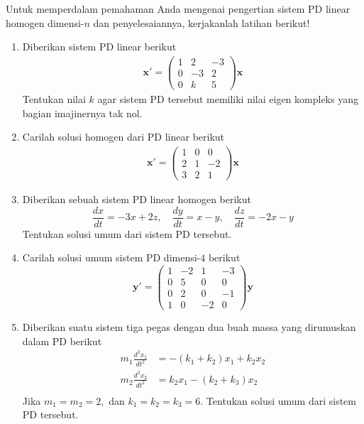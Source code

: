 \documentclass[a4paper]{article}
\theoremstyle{definisi}
\numberwithin{equation}{section}
\begin{document}
  \newpage
  \noindent Untuk memperdalam pemahaman Anda mengenai pengertian sistem PD linear homogen dimensi-$n$ dan penyelesaiannya, kerjakanlah latihan berikut!
  \begin{enumerate}
    \item Diberikan sistem PD linear berikut
    \begin{align*}
      \mathbf{x'} = \begin{pmatrix}
        1 & 2 & -3\\
        0 & -3 & 2\\
        0 & k & 5
      \end{pmatrix}\mathbf{x}
    \end{align*}
    Tentukan nilai $k$ agar sistem PD tersebut memiliki nilai eigen kompleks yang bagian imajinernya tak nol.
    \item Carilah solusi homogen dari PD linear berikut
    \begin{align*}
      \mathbf{x'} = \begin{pmatrix}
        1 & 0 & 0\\
        2 & 1 & -2\\
        3 & 2 & 1
      \end{pmatrix}\mathbf{x}
    \end{align*}

    \item Diberikan sebuah sistem PD linear homogen berikut
    \begin{equation*}
        \frac{dx}{dt}=-3x+2z,\quad
        \frac{dy}{dt}=x-y,\quad
        \frac{dz}{dt}=-2x-y
    \end{equation*}
    Tentukan solusi umum dari sistem PD tersebut.
    
    \item Carilah solusi umum sistem PD dimensi-$4$ berikut
    \[\mathbf{y'}=\begin{pmatrix}
      1 & -2 & 1 & -3\\
      0 & 5 & 0 & 0\\
      0 & 2 & 0 & -1\\
      1 & 0 & -2 & 0
    \end{pmatrix}\mathbf{y}\]
    
    \item Diberikan suatu sistem tiga pegas dengan dua buah massa yang dirumuskan dalam PD berikut
    \begin{equation*}
      \begin{split}
        m_1\frac{d^2x_1}{dt^2}&=-(k_1+k_2)x_1+k_2x_2\\
        m_2\frac{d^2x_2}{dt^2}&=k_2x_1-(k_2+k_3)x_2\\
      \end{split}
    \end{equation*}
    Jika $m_1=m_2=2,$ dan $k_1=k_2=k_3=6$. Tentukan solusi umum dari sistem PD tersebut.
  \end{enumerate}
\end{document}
